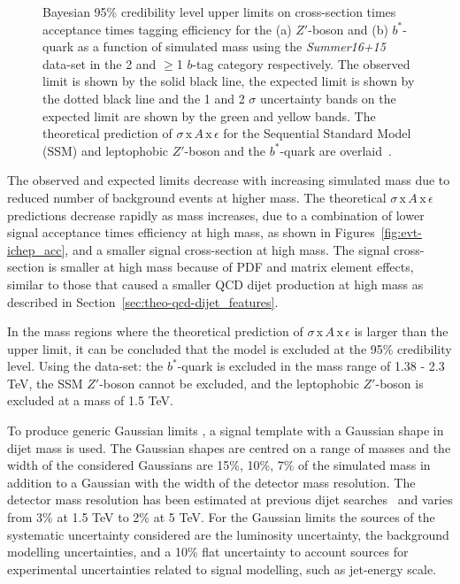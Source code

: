 \begin{figure}[!ht]
           {Bayesian 95\% credibility level upper limits on cross-section times acceptance times tagging efficiency
             for the (a) $Z'$-boson and (b) $b^*$-quark  as a function of simulated mass
             using the \textit{Summer16+15} data-set in the 2 and $\geq$1 $b$-tag category respectively.
             The observed limit is shown by the solid black line,
             the expected limit is shown by the dotted black line
             and the 1 and 2 $\sigma$ uncertainty bands on the expected limit are shown by the green and yellow bands.
             The theoretical prediction of $\sigma\,\text{x}\,\mathit{A}\,\text{x}\,\epsilon$
             for the Sequential Standard Model (SSM) and leptophobic $Z'$-boson and the $b^*$-quark are overlaid~\cite{dibjet-ichep_conf}.
           }
  \label{fig:lim-summer_benchmark}
\end{figure}

The observed and expected limits decrease with increasing simulated mass
due to reduced number of background events at higher mass.
The theoretical $\sigma\,\text{x}\,\mathit{A}\,\text{x}\,\epsilon$ predictions
decrease rapidly as mass increases, due to a combination of
lower signal acceptance times efficiency at high mass, as shown in Figures~\ref{fig:evt-ichep_acc},
and a smaller signal cross-section at high mass.
The signal cross-section is smaller at high mass because of PDF and matrix element effects,
similar to those that caused a smaller QCD dijet production at high mass as described in
 Section~\ref{sec:theo-qcd-dijet_features}.

In the mass regions where the theoretical prediction of $\sigma\,\text{x}\,\mathit{A}\,\text{x}\,\epsilon$
is larger than the upper limit, it can be concluded that the model is excluded at the 95\% credibility level.
Using the \summer{} data-set:
the \mbox{$b^*$-quark} is excluded in the mass range of 1.38 - 2.3 TeV,
the SSM $Z'$-boson cannot be excluded,
and the leptophobic $Z'$-boson is excluded at a mass of 1.5 TeV.

To produce generic Gaussian limits ,
a signal template with a Gaussian shape in dijet mass is used.
The Gaussian shapes are centred on a range of masses
and the width of the considered Gaussians are
15\%, 10\%, 7\% of the simulated mass
in addition to a Gaussian with the width of the detector mass resolution.
The detector mass resolution has been estimated
at previous dijet searches~\cite{dijet-mori16_paper}
and varies from 3\% at 1.5 TeV to 2\% at 5 TeV.
For the Gaussian limits the sources of the systematic uncertainty considered
are the luminosity uncertainty,
the background modelling uncertainties,
and a 10\% flat uncertainty to account sources for
experimental uncertainties related to signal modelling,
such as jet-energy scale.

